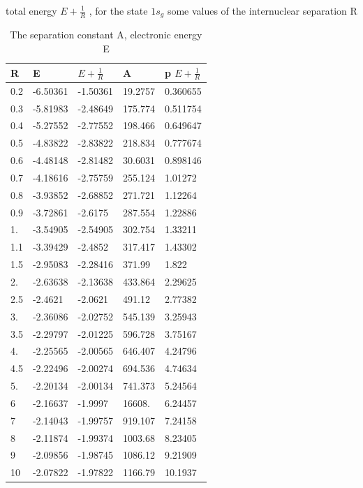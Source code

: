     \begin{table}[h!]
  \caption{ The separation constant A, electronic energy E}{total energy $ E + \frac{1}{R} $ , for the state $ 1s_g $ some values of the internuclear separation R }
  \centering
  \label{1sg}
		\begin{tabular}{ m{6em} m{6em}  m{6em}  m{6em} m{6em} }
			\hline
			R & E & $ E + \frac{1}{R} $ & A & p $ E + \frac{1}{R} $ \\ \hline \hline
 0.2 & -6.50361 & -1.50361 & 19.2757 & 0.360655\\
 0.3 & -5.81983 & -2.48649 & 175.774 & 0.511754\\
 0.4 & -5.27552 & -2.77552 & 198.466 & 0.649647\\
 0.5 & -4.83822 & -2.83822 & 218.834 & 0.777674\\
 0.6 & -4.48148 & -2.81482 & 30.6031 & 0.898146\\
 0.7 & -4.18616 & -2.75759 & 255.124 & 1.01272\\
 0.8 & -3.93852 & -2.68852 & 271.721 & 1.12264\\
 0.9 & -3.72861 & -2.6175 & 287.554 & 1.22886\\
 1. & -3.54905 & -2.54905 & 302.754 & 1.33211\\
 1.1 & -3.39429 & -2.4852 & 317.417 & 1.43302\\
 1.5 & -2.95083 & -2.28416 & 371.99 & 1.822\\
 2. & -2.63638 & -2.13638 & 433.864 & 2.29625\\
 2.5 & -2.4621 & -2.0621 & 491.12 & 2.77382\\
 3. & -2.36086 & -2.02752 & 545.139 & 3.25943\\
 3.5 & -2.29797 & -2.01225 & 596.728 & 3.75167\\
 4. & -2.25565 & -2.00565 & 646.407 & 4.24796\\
 4.5 & -2.22496 & -2.00274 & 694.536 & 4.74634\\
 5. & -2.20134 & -2.00134 & 741.373 & 5.24564\\
 6 & -2.16637 & -1.9997 & 16608. & 6.24457\\
 7 & -2.14043 & -1.99757 & 919.107 & 7.24158\\
 8 & -2.11874 & -1.99374 & 1003.68 & 8.23405\\
 9 & -2.09856 & -1.98745 & 1086.12 & 9.21909\\
 10 & -2.07822 & -1.97822 & 1166.79 & 10.1937 \\
          \hline
		\end{tabular}
    \end{table}

